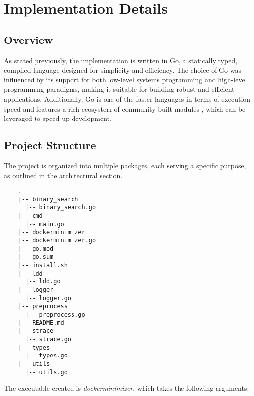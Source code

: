 \chapter{Implementation Details}
\label{chap:implementation-details}

\section{Overview}

As stated previously, the implementation is written in Go, a statically typed, compiled language designed for simplicity and efficiency. The choice of Go was influenced by its 
support for both low-level systems programming and high-level programming paradigms, making it suitable for building robust and efficient applications.
Additionally, Go is one of the faster languages in terms of execution speed and features a rich ecosystem of community-built modules \cite{go-pkg}, which can be leveraged to speed up development.


\section{Project Structure}

The project is organized into multiple packages, each serving a specific purpose, as outlined in the architectural section.

\lstset{language=bash,caption=Project Structure,label=lst:project-structure}
\begin{lstlisting}
    .
	|-- binary_search
	  |-- binary_search.go
    |-- cmd
      |-- main.go
    |-- dockerminimizer
    |-- dockerminimizer.go
    |-- go.mod
    |-- go.sum
    |-- install.sh
    |-- ldd
      |-- ldd.go
    |-- logger
      |-- logger.go
    |-- preprocess
      |-- preprocess.go
    |-- README.md
    |-- strace
      |-- strace.go
    |-- types
      |-- types.go
    |-- utils
      |-- utils.go
\end{lstlisting}

The executable created is \textit{dockerminimizer}, which takes the following arguments:

